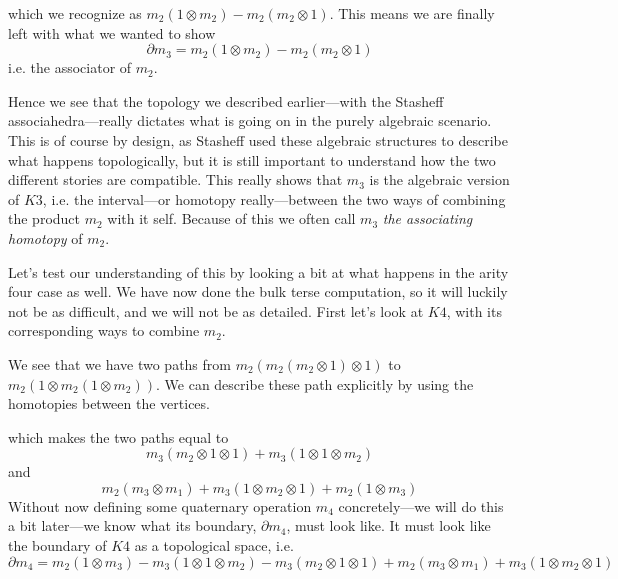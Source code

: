 which we recognize as $m_2(1\otimes m_2) - m_2(m_2\otimes 1)$. This means we are finally left with what we wanted to show 
\begin{equation*}
    \partial m_3 = m_2(1\otimes m_2)-m_2(m_2\otimes 1)
\end{equation*}
i.e. the associator of $m_2$. 

Hence we see that the topology we described earlier---with the Stasheff associahedra---really dictates what is going on in the purely algebraic scenario. This is of course by design, as Stasheff used these algebraic structures to describe what happens topologically, but it is still important to understand how the two different stories are compatible. This really shows that $m_3$ is the algebraic version of $K3$, i.e. the interval---or homotopy really---between the two ways of combining the product $m_2$ with it self. Because of this we often call $m_3$ \emph{the associating homotopy} of $m_2$. 

Let's test our understanding of this by looking a bit at what happens in the arity four case as well. We have now done the bulk terse computation, so it will luckily not be as difficult, and we will not be as detailed. First let's look at $K4$, with its corresponding ways to combine $m_2$. 

\hspace{2mm}

\begin{center}
\def\svgwidth{0.7\textwidth}

\end{center}

\hspace{1mm}

We see that we have two paths from $m_2(m_2(m_2\otimes 1)\otimes 1)$ to $m_2(1\otimes m_2(1\otimes m_2))$. We can describe these path explicitly by using the homotopies between the vertices. 

\hspace{1mm}

\begin{center}
\def\svgwidth{0.7\textwidth}

\end{center}

\hspace{1mm}

which makes the two paths equal to
\begin{equation*}
    m_3(m_2\otimes 1\otimes 1) + m_3(1\otimes 1\otimes m_2)
\end{equation*}
and 
\begin{equation*}
    m_2(m_3\otimes m_1)+m_3(1\otimes m_2\otimes 1)+m_2(1\otimes m_3)
\end{equation*}
Without now defining some quaternary operation $m_4$ concretely---we will do this a bit later---we know what its boundary, $\partial m_4$, must look like. It must look like the boundary of $K4$ as a topological space, i.e. 
\begin{equation*}
    \partial m_4 = m_2(1\otimes m_3) - m_3(1\otimes 1\otimes m_2) - m_3(m_2\otimes 1\otimes 1) + m_2(m_3\otimes m_1)+m_3(1\otimes m_2\otimes 1)
\end{equation*}

